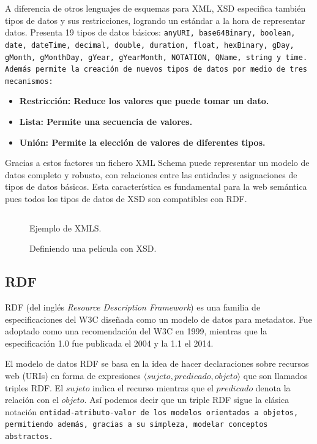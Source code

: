 A diferencia de otros lenguajes de esquemas para XML, XSD especifica también
tipos de datos y sus restricciones, logrando un estándar a la hora de
representar datos\cite{biron2004xml}. 
Presenta 19 tipos de datos básicos: \tt{anyURI},
\tt{base64Binary}, \tt{boolean}, \tt{date}, \tt{dateTime}, \tt{decimal},
\tt{double}, \tt{duration}, \tt{float}, \tt{hexBinary}, \tt{gDay}, \tt{gMonth},
\tt{gMonthDay}, \tt{gYear}, \tt{gYearMonth}, \tt{NOTATION}, \tt{QName},
\tt{string} y \tt{time}. Además permite la creación de nuevos tipos de datos por
medio de tres mecanismos:
\begin{itemize}
  \item \bf{Restricción:} Reduce los valores que puede tomar un dato.
  \item \bf{Lista:} Permite una secuencia de valores.
  \item \bf{Unión:} Permite la elección de valores de diferentes tipos.
\end{itemize}

Gracias a estos factores un fichero XML Schema puede representar un modelo de
datos completo y robusto, con relaciones entre las entidades y asignaciones de 
tipos de datos básicos.
Esta característica es fundamental para la web semántica pues todos los tipos de
datos de XSD son compatibles con RDF.

\begin{figure}[htpb]
  \centering
  \begin{tabular}{c}
    
  \end{tabular}
  \caption{Ejemplo de XMLS.}
  \vspace{-.25cm}
  \caption*{Definiendo una película con XSD.}
  \label{fig:xsdex}
\end{figure}

\subsection{RDF}
RDF (del inglés \emph{Resource Description Framework}) es una familia de
especificaciones del W3C diseñada como un modelo de datos para metadatos.
Fue adoptado como una recomendación del W3C en 1999, mientras que la
especificación 1.0 fue publicada el 2004 y la 1.1 el
2014\cite{bikakis2013semantic}.

El modelo de datos RDF se basa en la idea de hacer declaraciones sobre 
recursos web (URIs) en forma de expresiones $\langle sujeto, predicado, objeto
\rangle$ que son llamados triples RDF.
El $sujeto$ indica el recurso mientras que el $predicado$ denota la relación
con el $objeto$.
Así podemos decir que un triple RDF sigue la clásica notación 
\tt{entidad-atributo-valor} de los modelos orientados a objetos, permitiendo
además, gracias a su simpleza, modelar conceptos abstractos.

